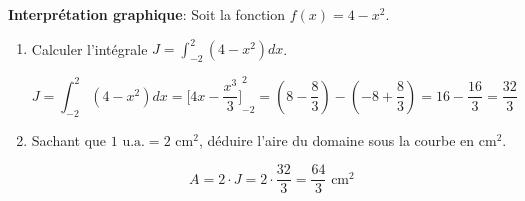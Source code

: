 \documentclass[11pt, a4paper]{report}
\begin{document}
\bigskip

 \medskip

\textbf{Interprétation graphique}: 
Soit la fonction $f(x) = 4-x^2$.
\begin{enumerate}
    \item Calculer l'intégrale $J = \displaystyle\int_{-2}^{2} (4-x^2) dx$.
    \begin{blocvisible}[height=2]
        \[J = \int_{-2}^{2} (4-x^2) dx = {\Big[4x - \frac{x^3}{3} \Big]}_{-2}^{2} = \left(8 - \frac{8}{3}\right) - \left(-8 + \frac{8}{3}\right) = 16 - \frac{16}{3} = \frac{32}{3}\]
    \end{blocvisible}
    \item Sachant que $1 \text{ u.a.} = 2 \text{ cm}^2$, déduire l'aire du domaine sous la courbe en $\text{cm}^2$.
    \begin{blocvisible}[height=2]
        \[A = 2 \cdot J = 2 \cdot \frac{32}{3} = \frac{64}{3} \text{ cm}^2\]
    \end{blocvisible}
\end{enumerate}
\end{document}

